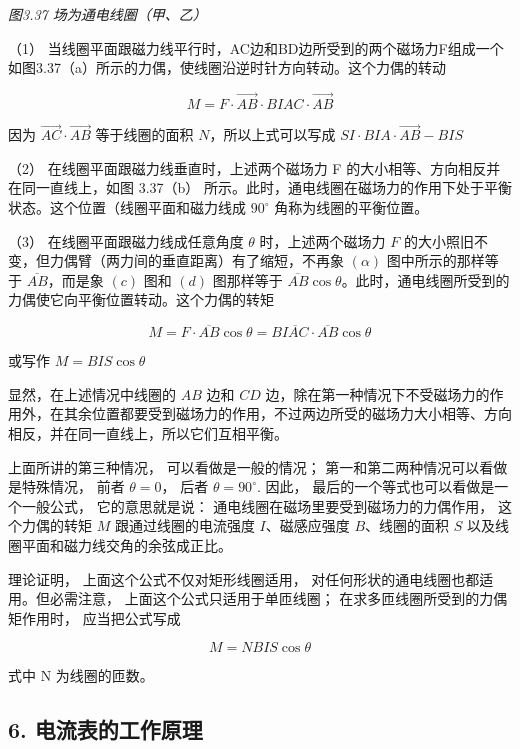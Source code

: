 \emph{图3.37 场为通电线圈（甲、乙）}

（1）
当线圈平面跟磁力线平行时，AC边和BD边所受到的两个磁场力F组成一个如图3.37（a）所示的力偶，使线圈沿逆时针方向转动。这个力偶的转动

\[
M = F \cdot \overrightarrow {A B} \cdot B I A C \cdot \overrightarrow {A B}
\]

因为 \(\overrightarrow{AC} \cdot \overrightarrow{AB}\) 等于线圈的面积
\(N\)，所以上式可以写成 \(SI \cdot BIA \cdot \overrightarrow{AB} - BIS\)

（2） 在线圈平面跟磁力线垂直时，上述两个磁场力 F
的大小相等、方向相反并在同一直线上，如图 3.37（b）
所示。此时，通电线圈在磁场力的作用下处于平衡状态。这个位置（线圈平面和磁力线成
\(90^{\circ}\) 角称为线圈的平衡位置。

（3） 在线圈平面跟磁力线成任意角度 \(\theta\) 时，上述两个磁场力 \(F\)
的大小照旧不变，但力偶臂（两力间的垂直距离）有了缩短，不再象
\((\alpha)\) 图中所示的那样等于 \(\overline{AB}\)，而是象 \((c)\) 图和
\((d)\) 图那样等于
\(\overline{AB} \cos \theta\)。此时，通电线圈所受到的力偶使它向平衡位置转动。这个力偶的转矩

\[
M = F \cdot \overline {{{A B}}} \cos \theta = B \overline {{{I A C}}} \cdot \overline {{{A B}}} \cos \theta
\]

或写作 \(M = BIS\cos \theta\)

显然，在上述情况中线圈的 \(AB\) 边和 \(CD\)
边，除在第一种情况下不受磁场力的作用外，在其余位置都要受到磁场力的作用，不过两边所受的磁场力大小相等、方向相反，并在同一直线上，所以它们互相平衡。

上面所讲的第三种情况， 可以看做是一般的情况；
第一和第二两种情况可以看做是特殊情况， 前者 \(\theta = 0\)， 后者
\(\theta = 90^{\circ}\). 因此， 最后的一个等式也可以看做是一个一般公式，
它的意思就是说： 通电线圈在磁场里要受到磁场力的力偶作用， 这个力偶的转矩
\(M\) 跟通过线圈的电流强度 \(I\)、磁感应强度 \(B\)、线圈的面积 \(S\)
以及线圈平面和磁力线交角的余弦成正比。

理论证明， 上面这个公式不仅对矩形线圈适用，
对任何形状的通电线圈也都适用。但必需注意，
上面这个公式只适用于单匝线圈； 在求多匝线圈所受到的力偶矩作用时，
应当把公式写成

\[
M=NBIS\cos\theta
\]

式中 N 为线圈的匝数。

\subsection{6.
电流表的工作原理}\label{ux7535ux6d41ux8868ux7684ux5de5ux4f5cux539fux7406}

